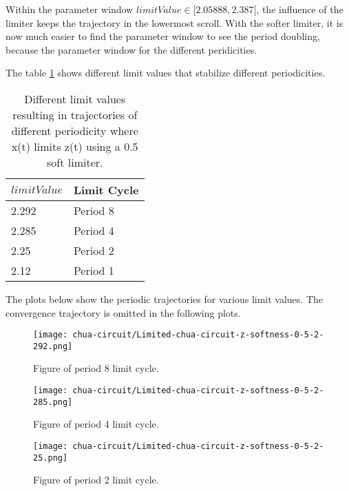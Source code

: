 \documentclass[main]{subfiles}
\begin{document}
Within the parameter window \(limitValue \in [2.05888,2.387[\), the influence of the limiter keeps the trajectory in the lowermost scroll. With the softer limiter, it is now much easier to find the parameter window to see the period doubling, because the parameter window for the different peridicities. 

The table \ref{table:z-0.5-periodicities} shows different limit values that stabilize different periodicities.

\begin{table}[H]
\renewcommand{\arraystretch}{1.2}
\center
\begin{tabular}{@{}ll@{}}
	\toprule
   \(limitValue\) & Limit Cycle\\
   \midrule
   2.292 & Period 8 \\ 
   2.285 & Period 4 \\
   2.25  & Period 2 \\
   2.12 & Period 1 \\
   \bottomrule
\end{tabular}
\caption[Periodicity control limit values (x(t) limiting z(t) with softness 0.5)]{Different limit values resulting in trajectories of different periodicity where x(t) limits z(t) using a 0.5 soft limiter.}
\label{table:z-0.5-periodicities}
\end{table}

The plots below show the periodic trajectories for various limit values. The convergence trajectory is omitted in the following plots.


\begin{figure}[H]
\centering
\texttt{[image: chua-circuit/Limited-chua-circuit-z-softness-0-5-2-292.png]}
\caption[Figure of period 8 limit cycle.]{Figure of period 8 limit cycle.}
\label{figure:z-0.5-8-limit-cycle-trajectory}
\end{figure}

\begin{figure}[H]
\centering
\texttt{[image: chua-circuit/Limited-chua-circuit-z-softness-0-5-2-285.png]}
\caption[Figure of period 4 limit cycle.]{Figure of period 4 limit cycle.}
\label{figure:z-0.5-4-limit-cycle-trajectory}
\end{figure}

\begin{figure}[H]
\centering
\texttt{[image: chua-circuit/Limited-chua-circuit-z-softness-0-5-2-25.png]}
\caption[Figure of period 3 limit cycle.]{Figure of period 2 limit cycle.}
\label{figure:z-0.5-2-limit-cycle-trajectory}
\end{figure}
\end{document}
